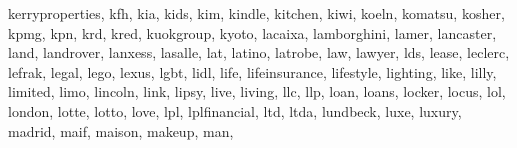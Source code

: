 \documentclass[letterpaper,10pt,english]{sphinxmanual}
\begin{document}
\begin{fulllineitems}
\begin{fulllineitems}
\textquotesingle{}kerryproperties\textquotesingle{}, \textquotesingle{}kfh\textquotesingle{}, \textquotesingle{}kia\textquotesingle{}, \textquotesingle{}kids\textquotesingle{}, \textquotesingle{}kim\textquotesingle{}, \textquotesingle{}kindle\textquotesingle{}, \textquotesingle{}kitchen\textquotesingle{}, \textquotesingle{}kiwi\textquotesingle{}, \textquotesingle{}koeln\textquotesingle{}, \textquotesingle{}komatsu\textquotesingle{}, \textquotesingle{}kosher\textquotesingle{}, \textquotesingle{}kpmg\textquotesingle{}, \textquotesingle{}kpn\textquotesingle{}, \textquotesingle{}krd\textquotesingle{}, \textquotesingle{}kred\textquotesingle{}, \textquotesingle{}kuokgroup\textquotesingle{}, \textquotesingle{}kyoto\textquotesingle{}, \textquotesingle{}lacaixa\textquotesingle{}, \textquotesingle{}lamborghini\textquotesingle{}, \textquotesingle{}lamer\textquotesingle{}, \textquotesingle{}lancaster\textquotesingle{}, \textquotesingle{}land\textquotesingle{}, \textquotesingle{}landrover\textquotesingle{}, \textquotesingle{}lanxess\textquotesingle{}, \textquotesingle{}lasalle\textquotesingle{}, \textquotesingle{}lat\textquotesingle{}, \textquotesingle{}latino\textquotesingle{}, \textquotesingle{}latrobe\textquotesingle{}, \textquotesingle{}law\textquotesingle{}, \textquotesingle{}lawyer\textquotesingle{}, \textquotesingle{}lds\textquotesingle{}, \textquotesingle{}lease\textquotesingle{}, \textquotesingle{}leclerc\textquotesingle{}, \textquotesingle{}lefrak\textquotesingle{}, \textquotesingle{}legal\textquotesingle{}, \textquotesingle{}lego\textquotesingle{}, \textquotesingle{}lexus\textquotesingle{}, \textquotesingle{}lgbt\textquotesingle{}, \textquotesingle{}lidl\textquotesingle{}, \textquotesingle{}life\textquotesingle{}, \textquotesingle{}lifeinsurance\textquotesingle{}, \textquotesingle{}lifestyle\textquotesingle{}, \textquotesingle{}lighting\textquotesingle{}, \textquotesingle{}like\textquotesingle{}, \textquotesingle{}lilly\textquotesingle{}, \textquotesingle{}limited\textquotesingle{}, \textquotesingle{}limo\textquotesingle{}, \textquotesingle{}lincoln\textquotesingle{}, \textquotesingle{}link\textquotesingle{}, \textquotesingle{}lipsy\textquotesingle{}, \textquotesingle{}live\textquotesingle{}, \textquotesingle{}living\textquotesingle{}, \textquotesingle{}llc\textquotesingle{}, \textquotesingle{}llp\textquotesingle{}, \textquotesingle{}loan\textquotesingle{}, \textquotesingle{}loans\textquotesingle{}, \textquotesingle{}locker\textquotesingle{}, \textquotesingle{}locus\textquotesingle{}, \textquotesingle{}lol\textquotesingle{}, \textquotesingle{}london\textquotesingle{}, \textquotesingle{}lotte\textquotesingle{}, \textquotesingle{}lotto\textquotesingle{}, \textquotesingle{}love\textquotesingle{}, \textquotesingle{}lpl\textquotesingle{}, \textquotesingle{}lplfinancial\textquotesingle{}, \textquotesingle{}ltd\textquotesingle{}, \textquotesingle{}ltda\textquotesingle{}, \textquotesingle{}lundbeck\textquotesingle{}, \textquotesingle{}luxe\textquotesingle{}, \textquotesingle{}luxury\textquotesingle{}, \textquotesingle{}madrid\textquotesingle{}, \textquotesingle{}maif\textquotesingle{}, \textquotesingle{}maison\textquotesingle{}, \textquotesingle{}makeup\textquotesingle{}, \textquotesingle{}man\textquotesingle{}, 
\end{fulllineitems}
\end{fulllineitems}
\end{document}
